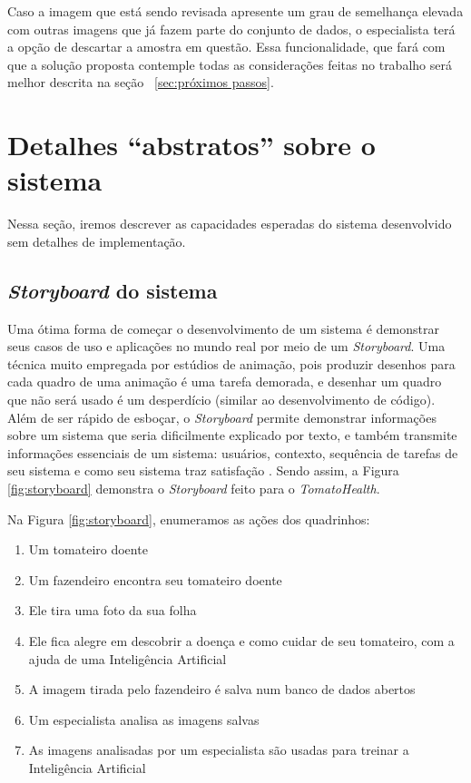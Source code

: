 Caso a imagem que está sendo revisada apresente um grau de semelhança elevada com outras imagens que já fazem parte do conjunto de dados, o especialista terá a opção de descartar a amostra em questão. Essa funcionalidade, que fará com que a solução proposta contemple todas as considerações feitas no trabalho será melhor descrita na seção ~\ref{sec:próximos passos}.

\section{{Detalhes ``abstratos'' sobre o sistema} \label{sec:abst-det}}

Nessa seção, iremos descrever as capacidades esperadas do sistema desenvolvido sem detalhes de implementação.

\subsection{{\textit{Storyboard} do sistema}}

Uma ótima forma de começar o desenvolvimento de um sistema é demonstrar seus casos de uso e aplicações no mundo real por meio de um \textit{Storyboard}. Uma técnica muito empregada por estúdios de animação, pois produzir desenhos para cada quadro de uma animação é uma tarefa demorada, e desenhar um quadro que não será usado é um desperdício (similar ao desenvolvimento de código). Além de ser rápido de esboçar, o \textit{Storyboard} permite demonstrar informações sobre um sistema que seria dificilmente explicado por texto, e também transmite informações essenciais de um sistema: usuários, contexto, sequência de tarefas de seu sistema e como seu sistema traz satisfação \citep{klemmer2016}. Sendo assim, a Figura \ref{fig:storyboard} demonstra o \textit{Storyboard} feito para o \emph{TomatoHealth}.

Na Figura \ref{fig:storyboard}, enumeramos as ações dos quadrinhos:

\begin{enumerate}
    \item Um tomateiro doente
    \item Um fazendeiro encontra seu tomateiro doente
    \item Ele tira uma foto da sua folha
    \item Ele fica alegre em descobrir a doença e como cuidar de seu tomateiro, com a ajuda de uma Inteligência Artificial
    \item A imagem tirada pelo fazendeiro é salva num banco de dados abertos
    \item Um especialista analisa as imagens salvas
    \item As imagens analisadas por um especialista são usadas para treinar a Inteligência Artificial
\end{enumerate}

